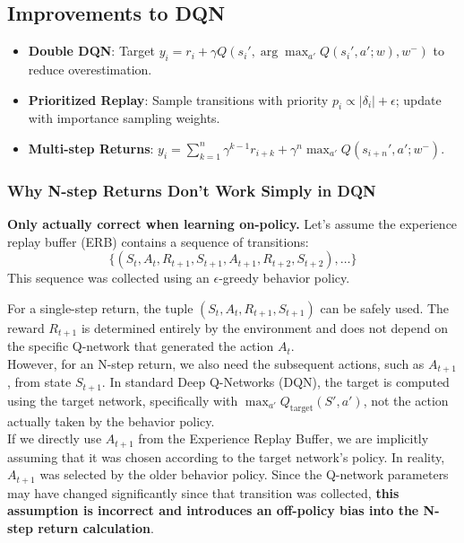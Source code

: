 \documentclass[12pt]{article}
\begin{document}
\subsection{Improvements to DQN}
\begin{itemize}
    \item \textbf{Double DQN}: Target $y_i = r_i + \gamma Q(s_i', \arg\max_{a'} Q(s_i', a'; w), w^-)$ to reduce overestimation.
    \item \textbf{Prioritized Replay}: Sample transitions with priority $p_i \propto |\delta_i| + \epsilon$; update with importance sampling weights.
    \item \textbf{Multi-step Returns}: $y_i = \sum_{k=1}^n \gamma^{k-1} r_{i+k} + \gamma^n \max_{a'} Q(s_{i+n}', a'; w^-)$.
\end{itemize}

\subsubsection{Why N-step Returns Don't Work Simply in DQN}

\textbf{Only actually correct when learning on-policy.}
Let's assume the experience replay buffer (ERB) contains a sequence of transitions:
\[
\{ (S_t, A_t, R_{t+1}, S_{t+1}, A_{t+1}, R_{t+2}, S_{t+2}), \dots \}
\]
This sequence was collected using an $\epsilon$-greedy behavior policy.

For a single-step return, the tuple $(S_t, A_t, R_{t+1}, S_{t+1})$ can be safely used. The reward $R_{t+1}$ is determined entirely by the environment and does not depend on the specific Q-network that generated the action $A_t$.\\

However, for an N-step return, we also need the subsequent actions, such as $A_{t+1}$, from state $S_{t+1}$. In standard Deep Q-Networks (DQN), the target is computed using the target network, specifically with $\max_{a'} Q_{\text{target}}(S', a')$, not the action actually taken by the behavior policy.\\

If we directly use $A_{t+1}$ from the Experience Replay Buffer, we are implicitly assuming that it was chosen according to the target network's policy. In reality, $A_{t+1}$ was selected by the older behavior policy. Since the Q-network parameters may have changed significantly since that transition was collected, \textbf{this assumption is incorrect and introduces an off-policy bias into the N-step return calculation}.\\
\end{document}
